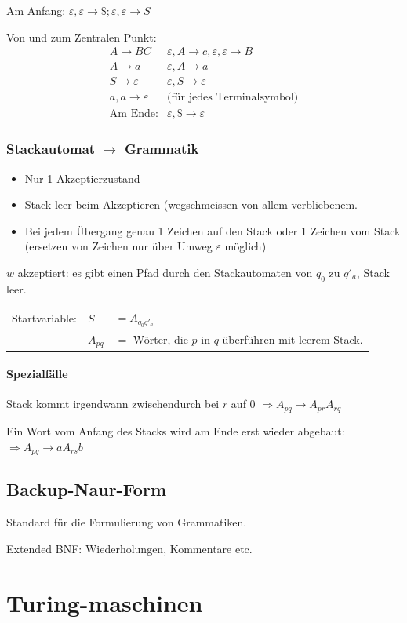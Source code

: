 Am Anfang: $\varepsilon, \varepsilon \to \$; \varepsilon, \varepsilon \to S$


Von und zum Zentralen Punkt: 
\begin{align*}
A \to BC & \varepsilon, A \to c, \varepsilon, \varepsilon \to B \\
A \to a & \varepsilon, A \to a \\
S \to \varepsilon & \varepsilon, S \to \varepsilon \\
a, a \to \varepsilon & \text{(für jedes Terminalsymbol)} \\
\text{Am Ende:} & \varepsilon, \$ \to \varepsilon 
\end{align*}

\subsubsection{Stackautomat $\to$ Grammatik}

\begin{itemize}
	 \item Nur 1 Akzeptierzustand
	 \item Stack leer beim Akzeptieren (wegschmeissen von allem verbliebenem.
	 \item Bei jedem Übergang genau 1 Zeichen auf den Stack oder 1 Zeichen vom Stack (ersetzen von Zeichen nur über Umweg $\varepsilon$ möglich)
\end{itemize}

$w$ akzeptiert: es gibt einen Pfad durch den Stackautomaten von $q_0$ zu $q'_a$, Stack leer.

\begin{tabular}{l l l}
	Startvariable: & $S$&$=A_{q_0 q'_a}$ \\
	& $A_{pq}$&$= $ Wörter, die $p$ in $q$ überführen mit leerem Stack.
\end{tabular}

\paragraph{Spezialfälle}

Stack kommt irgendwann zwischendurch bei $r$ auf 0 $\Rightarrow A_{pq} \to A_{pr} A_{rq}$

Ein Wort vom Anfang des Stacks wird am Ende erst wieder abgebaut: $\Rightarrow A_{pq} \to a A_{rs} b$

\subsection{Backup-Naur-Form}

Standard für die Formulierung von Grammatiken.

Extended BNF: Wiederholungen, Kommentare etc.

\section{Turing-maschinen}

